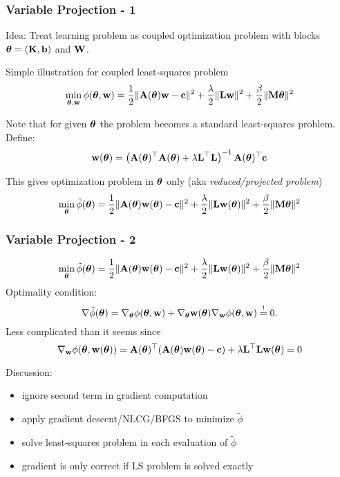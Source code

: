 \documentclass[12pt,fleqn]{beamer}
\begin{document}
\begin{frame}\frametitle{Variable Projection - 1}
	Idea: Treat learning problem as coupled optimization problem with blocks ${\boldsymbol \theta}=({\bf K},{\bf b})$ and ${\bf W}$. 
	
	Simple illustration for coupled least-squares problem~\cite{GoPe1973,GoPe03,OLearyRust2013}
	$$
		\min_{{\boldsymbol \theta},{\bf w}} \phi({\boldsymbol \theta},{\bf w}) = {\frac 12} \| {\bf A}({\boldsymbol \theta}) {\bf w} - {\bf c}\|^2 + \frac{\lambda}{2}\| {\bf L} {\bf w}\|^2 + \frac{\beta}{2} \| {\bf M} {\boldsymbol \theta}\|^2
	$$
	
	\pause
	
	Note that for given ${\boldsymbol \theta}$ the problem becomes a standard least-squares problem. Define: 
	$$
		{\bf w}({\boldsymbol \theta}) = \left( {\bf A}({\boldsymbol \theta})^\top {\bf A}({\boldsymbol \theta}) + \lambda {\bf L}^\top {\bf L} \right)^{-1}{{\bf A}({\boldsymbol \theta})^\top {\bf c}}
	$$
	
	\pause
	This gives optimization problem in ${\boldsymbol \theta}$ only (aka \emph{reduced/projected  problem})
	$$
		\min_{{\boldsymbol \theta}} \tilde{\phi}({\boldsymbol \theta}) = {\frac 12} \| {\bf A}({\boldsymbol \theta}) {\bf w}({\boldsymbol \theta}) - {\bf c}\|^2 + \frac{\lambda}{2}\| {\bf L} {\bf w}({\boldsymbol \theta})\|^2 + \frac{\beta}{2} \| {\bf M} {\boldsymbol \theta}\|^2
	$$
	
\end{frame}
\begin{frame}\frametitle{Variable Projection - 2}
	$$
		\min_{{\boldsymbol \theta}} \tilde{\phi}({\boldsymbol \theta}) = {\frac 12} \| {\bf A}({\boldsymbol \theta}) {\bf w}({\boldsymbol \theta}) - {\bf c}\|^2 + \frac{\lambda}{2}\| {\bf L} {\bf w}({\boldsymbol \theta})\|^2 + \frac{\beta}{2} \| {\bf M} {\boldsymbol \theta}\|^2
	$$
	Optimality condition:
	$$ 
		\nabla \tilde{\phi}({\boldsymbol \theta}) = \nabla_{\boldsymbol \theta} \phi({\boldsymbol \theta},{\bf w}) + \nabla_{\boldsymbol \theta} {\bf w}({\boldsymbol \theta}) \nabla_{{\bf w}} \phi({\boldsymbol \theta},{\bf w}) \stackrel{!}{=} 0.
	$$
	Less complicated than it seems since
	$$
		\nabla_{{\bf w}} \phi({\boldsymbol \theta},{\bf w}({\boldsymbol \theta})) = {\bf A}({\boldsymbol \theta})^\top( {\bf A}({\boldsymbol \theta}) {\bf w}({\boldsymbol \theta}) - {\bf c}) + \lambda {\bf L}^\top {\bf L} {\bf w}({\boldsymbol \theta}) = 0
	$$
	
	Discussion:
	\begin{itemize}
		\item ignore second term in gradient computation
		\item apply gradient descent/NLCG/BFGS  to minimize $\tilde{\phi}$
		\item solve least-squares problem in each evaluation of $\tilde{\phi}$
		\item gradient is only correct if LS problem is solved exactly
	\end{itemize}
	
\end{frame}
\end{document}
